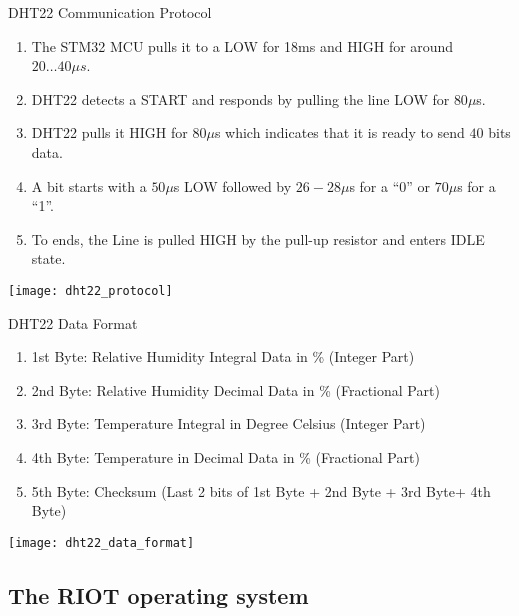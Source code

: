 \documentclass[aspectratio=169]{beamer}
\begin{document}
\begin{frame}{DHT22 Communication Protocol}
\begin{enumerate}

\item<1-> The STM32 MCU pulls it to a LOW for 18ms and HIGH for around $20 \ldots 40\mu s$.
\item<2-> DHT22 detects a START and responds by pulling the line LOW for $80\mu$s.
\item<3-> DHT22 pulls it HIGH for $80\mu$s which indicates that it is ready to send $40$ bits  data.
\item<4-> A bit starts with a $50 \mu$s LOW followed by $26-28\mu$s for a ``0'' or $70\mu$s for a ``1''.
\item<5> To ends, the Line is pulled HIGH by the pull-up resistor and enters IDLE state.

\end{enumerate}

\centering
\texttt{[image: dht22\_protocol]}
\end{frame}


\begin{frame}{DHT22 Data Format}
\begin{enumerate}

\item<1-> 1st Byte: Relative Humidity Integral Data in \% (Integer Part)
\item<2-> 2nd Byte: Relative Humidity Decimal Data in \% (Fractional Part)
\item<3-> 3rd Byte: Temperature Integral in Degree Celsius (Integer Part)
\item<4-> 4th Byte: Temperature in Decimal Data in \% (Fractional Part) 
\item<5-> 5th Byte: Checksum (Last 2 bits of {1st Byte + 2nd Byte + 3rd Byte+ 4th Byte})

\end{enumerate}

\centering
\texttt{[image: dht22\_data\_format]}
\end{frame}






\subsection{The RIOT operating system}
\end{document}
